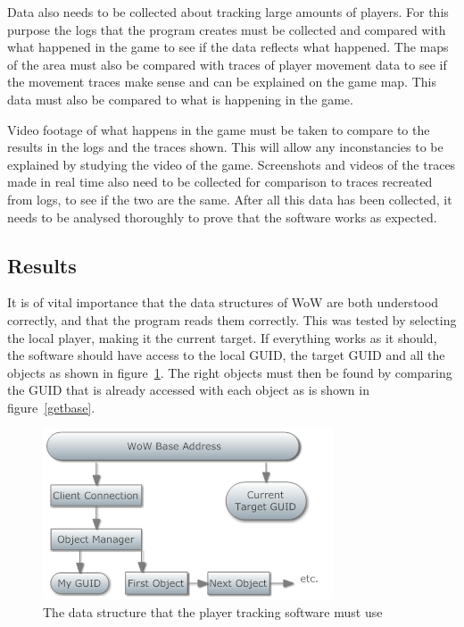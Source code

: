 Data also needs to be collected about tracking large amounts of players. For this purpose the logs that the program creates must be collected and compared with what happened in the game to see if the data reflects what happened. The maps of the area must also be compared with traces of player movement data to see if the movement traces make sense and can be explained on the game map. This data must also be compared to what is happening in the game. 

Video footage of what happens in the game must be taken to compare to the results in the logs and the traces shown. This will allow any inconstancies to be explained by studying the video of the game. Screenshots and videos of the traces made in real time also need to be collected for comparison to traces recreated from logs, to see if the two are the same. After all this data has been collected, it needs to be analysed thoroughly to prove that the software works as expected.

\subsection{Results}
\label{trackingresults}
It is of vital importance that the data structures of WoW are both understood correctly, and that the program reads them correctly. This was tested by selecting the local player, making it the current target. If everything works as it should, the software should have access to the local GUID, the target GUID and all the objects as shown in figure~\ref{test1}. The right objects must then be found by comparing the GUID that is already accessed with each object as is shown in figure~\ref{getbase}.


\begin{figure}[htbp]
\centering
\includegraphics[scale = 0.75]{test1.png}	
\caption{The data structure that the player tracking software must use}
\label{test1}
\end{figure}

